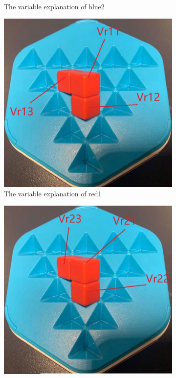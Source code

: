 \begin{figure}[htbp]
\begin{subfigure}[b]{0.25\textwidth}
\caption{The variable explanation of blue2}
  \label{fig:3Dblue2}
\end{subfigure}
\begin{subfigure}[b]{0.25\textwidth}
\centering
\includegraphics[width=\textwidth]{figs/3Dred1.jpg}
\caption{The variable explanation of red1}
  \label{fig:3Dred1}
\end{subfigure}
\begin{subfigure}[b]{0.25\textwidth}
\centering
\includegraphics[width=\textwidth]{figs/3Dred2.jpg}

\end{subfigure}
\end{figure}
